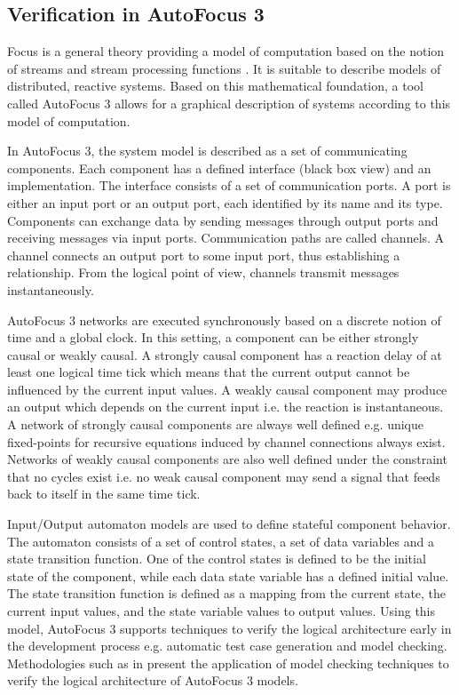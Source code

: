 \subsection{Verification in AutoFocus 3}

Focus is a general theory providing a model of computation based on the notion of streams and stream processing functions \cite{broy2012specification}. It is suitable to describe models of distributed, reactive systems. Based on this mathematical foundation, a tool called AutoFocus 3 allows for a graphical description of systems according to this model of computation. 

In AutoFocus 3, the system model is described as a set of communicating components. Each component has a defined interface (black box view) and an implementation. The interface consists of a set of communication ports. A port is either an input port or an output port, each identified by its name and its type. Components can exchange data by sending messages through output ports and receiving messages via input ports. Communication paths are called channels. A channel connects an output port to some input port, thus establishing a relationship. From the logical point of view, channels transmit messages instantaneously.

AutoFocus 3 networks are executed synchronously based on a discrete notion of time and a global clock. In this setting, a component can be either strongly causal or weakly causal. A strongly causal component has a reaction delay of at least one logical time tick which means that the current output cannot be influenced by the current input values. A weakly causal component may produce an output which depends on the current input i.e. the reaction is instantaneous. A network of strongly causal components are always well defined e.g. unique fixed-points for recursive equations induced by channel connections always exist. Networks of weakly causal components are also well defined under the constraint that no cycles exist i.e. no weak causal component may send a signal that feeds back to itself in the same time tick. 

Input/Output automaton models are used to define stateful component behavior. The automaton consists of a set of control states, a set of data variables and a state transition function. One of the control states is defined to be the initial state of the component, while each data state variable has a defined initial value. The state transition function is defined as a mapping from the current state, the current input values, and the state variable values to output values. Using this model, AutoFocus 3 supports techniques to verify the logical architecture early in the development process e.g. automatic test case generation and model checking. Methodologies such as in \cite{feilkas2009top} present the application of model checking techniques to verify the logical architecture of AutoFocus 3 models. 

